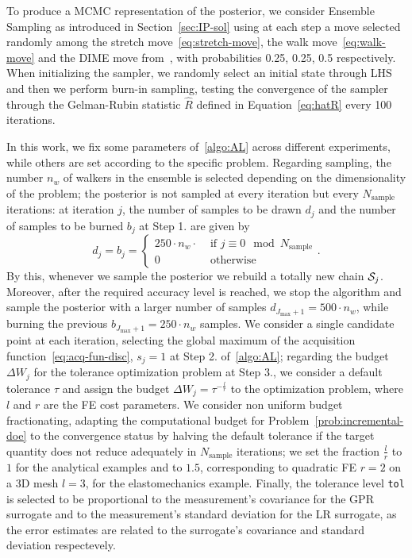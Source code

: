 To produce a MCMC representation of the posterior, we consider Ensemble Sampling as introduced in Section~\ref{sec:IP-sol} using at each step a move selected randomly among the stretch move~\eqref{eq:stretch-move}, the walk move~\eqref{eq:walk-move} and the DIME move from~\cite{Boehl}, with probabilities 0.25, 0.25, 0.5 respectively. 
When initializing the sampler, we randomly select an initial state through LHS and then we perform burn-in sampling, testing the convergence of the sampler through the Gelman-Rubin statistic $\hat R$ defined in Equation~\eqref{eq:hatR} every 100 iterations.
\medskip

In this work, we fix some parameters of~\ref{algo:AL} across different experiments, while others are set according to the specific problem.
Regarding sampling, the number $n_w$ of walkers in the ensemble is selected depending on the dimensionality of the problem; the posterior is not sampled at every iteration but every $N_{\text{sample}}$ iterations: at iteration $j$, the number of samples to be drawn $d_j$ and the number of samples to be burned $b_j$ at Step 1. are given by
\[
d_j = b_j = \begin{cases}
    250 \cdot n_w \cdot  & \text{ if } j \equiv 0 \mod N_{\text{sample}} \\
    0 & \text{ otherwise}
\end{cases}.
\]
By this, whenever we sample the posterior we rebuild a totally new chain $\mathcal S_j$. 
Moreover, after the required accuracy level is reached, we stop the algorithm and sample the posterior with a larger number of samples $d_{J_{\max} +1} = 500 \cdot n_w$, while burning the previous $b_{J_{\max} +1} = 250 \cdot n_w$ samples.\newline
We consider a single candidate point at each iteration, selecting the global maximum of the acquisition function~\eqref{eq:acq-fun-disc}, $s_j = 1$ at Step 2. of~\ref{algo:AL}; regarding the budget $\Delta W_j$ for the tolerance optimization problem at Step 3., we consider a default tolerance $\tau$ and assign the budget $\Delta W_j = \tau^{-\frac{l}{r}}$ to the optimization problem, where $l$ and $r$ are the FE cost parameters.
We consider non uniform budget fractionating, adapting the computational budget for Problem~\eqref{prob:incremental-doe} to the convergence status by halving the default tolerance if the target quantity does not reduce adequately in $N_\text{sample}$ iterations; we set the fraction $\frac{l}{r}$ to $1$ for the analytical examples and to $1.5$, corresponding to quadratic FE $r=2$ on a 3D mesh $l=3$, for the elastomechanics example.  \newline
Finally, the tolerance level \texttt{tol} is selected to be proportional to the measurement's covariance for the GPR surrogate and to the measurement's standard deviation for the LR surrogate, as the error estimates are related to the surrogate's covariance and standard deviation respectevely.\medskip

